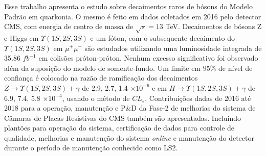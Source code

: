 \begin{resumo}
    Esse trabalho apresenta o estudo sobre decaimentos raros de bósons do Modelo Padrão em quarkonia. O mesmo é feito em dados coletados em 2016 pelo detector CMS, com energia de centro de massa de $\sqrt{s}=13$ TeV. Decaimentos de bósons Z e Higgs em $\Upsilon(1S,2S,3S)$ e um fóton, com o subsequente decaimento do $\Upsilon(1S,2S,3S)$ em $\mu^{+} \mu^{-}$ são estudados utilizando uma luminosidade integrada de 35.86 $fb^{-1}$ em colisões próton-próton. Nenhum excesso significativo foi observado além da suposição do modelo de somente-fundo. Um limite em $95\%$ de nível de confiança é colocado na razão de ramificação dos decaimentos $Z \rightarrow  \Upsilon(1S,2S,3S) + \gamma$ de 2.9, 2.7, 1.4 $\times 10^{-6}$ e em $H\rightarrow  \Upsilon(1S,2S,3S) + \gamma$ de 6.9, 7.4, 5.8 $\times 10^{-4}$, usando o método de $CL_s$. Contribuições dadas de 2016 até 2018 para a operação, manutenção e P\&D da Fase-2 de melhorias do sistema de Câmaras de Placas Resistivas do CMS também são apresentadas. Incluindo plantões para operação do sistema, certificação de dados para controle de qualidade, melhorias e manutenção do sistema \textit{online} e manutenção do detector durante o período de manutenção conhecido como LS2.
\end{resumo}
    